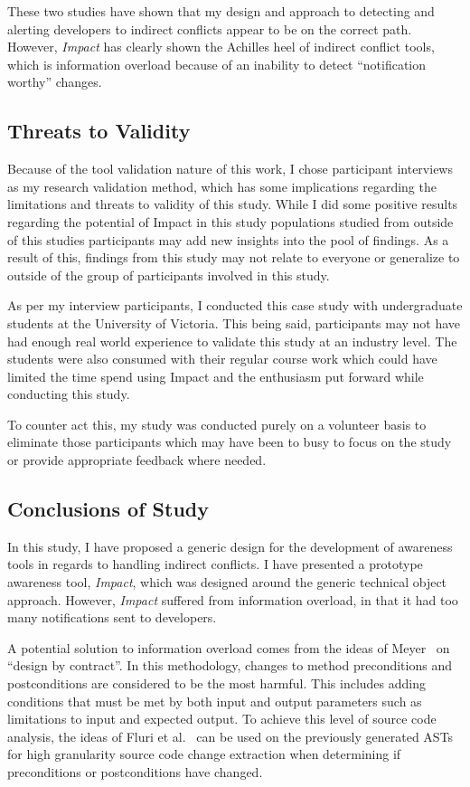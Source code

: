 These two studies have shown that my design and approach to
detecting and alerting developers to indirect conflicts appear
to be on the correct path. However, \textit{Impact} has clearly shown
the Achilles heel of indirect conflict tools, which is information
overload because of an inability to detect ``notification worthy''
changes.

\subsection{Threats to Validity}
Because of the tool validation nature of this work, I chose participant interviews as my research validation method, which has some implications regarding the
limitations and threats to validity of this study. While I did some positive results regarding the potential of Impact in this study
populations studied from outside of this studies participants may add new insights into the pool of findings. As a result of this, findings
from this study may not relate to everyone or generalize to outside of the group of participants involved in this study.

As per my interview participants, I conducted this case study with undergraduate students at the University of Victoria. This being said, participants
may not have had enough real world experience to validate this study at an industry level. The students were also consumed with their regular course
work which could have limited the time spend using Impact and the enthusiasm put forward while conducting this study.

To counter act this, my study was conducted purely on a volunteer basis to eliminate those participants which may have been to busy to focus
on the study or provide appropriate feedback where needed.

\subsection{Conclusions of Study}
\label{sec:ns}
In this study, I have proposed a generic 
design for the development of awareness tools in regards to
handling indirect conflicts. I have presented a prototype 
awareness tool, \textit{Impact}, which was designed around the generic 
technical object approach. However, \textit{Impact} suffered from
information overload, in that it had too many notifications sent to
developers.

A potential solution to information overload comes from the ideas of
Meyer~\cite{Meyer:1988} on ``design by contract''. In this methodology, changes to method
preconditions and postconditions are considered to be the most harmful. 
This includes adding conditions that must be met by both input
and output parameters such as limitations to input and expected
output. To achieve this level of source code analysis, the ideas of
Fluri et al.~\cite{Fluri:2007:CDT} can be used on the previously generated
ASTs for high granularity
source code change extraction when determining if preconditions or
postconditions have changed.

